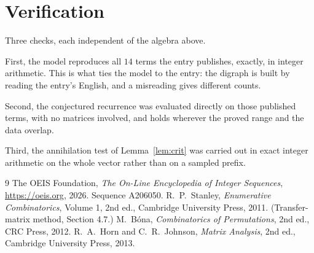 \documentclass[11pt,a4paper]{article}
\theoremstyle{plain}
\theoremstyle{definition}
\begin{document}
\section{Verification}

Three checks, each independent of the algebra above.

First, the model reproduces all $14$ terms the entry publishes, exactly, in integer
arithmetic. This is what ties the model to the entry: the digraph is built by reading the
entry's English, and a misreading gives different counts.

Second, the conjectured recurrence was evaluated directly on those published terms, with no
matrices involved, and holds wherever the proved range and the data overlap.

Third, the annihilation test of Lemma~\ref{lem:crit} was carried out in exact integer
arithmetic on the whole vector rather than on a sampled prefix.

\begin{thebibliography}{9}
 The OEIS Foundation, \emph{The On-Line Encyclopedia of Integer
Sequences}, \url{https://oeis.org}, 2026. Sequence A206050.
 R.~P.~Stanley, \emph{Enumerative Combinatorics}, Volume 1, 2nd ed.,
Cambridge University Press, 2011. (Transfer-matrix method, Section 4.7.)
 M.~B\'ona, \emph{Combinatorics of Permutations}, 2nd ed., CRC
Press, 2012.
 R.~A.~Horn and C.~R.~Johnson, \emph{Matrix Analysis}, 2nd ed., Cambridge
University Press, 2013.
\end{thebibliography}
\end{document}
